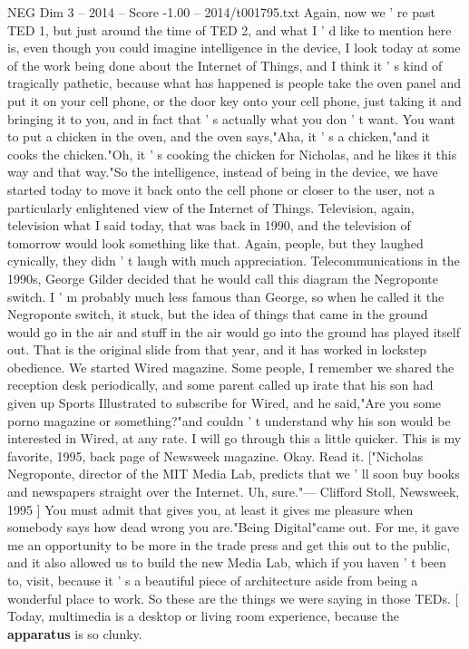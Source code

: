 \begin{textsample}{NEG Dim 3 – 2014 – Score -1.00 – 2014/t001795.txt}
Again, now we ' re past TED 1, but just around the time of TED 2, and what I ' d like to mention here is, even though you could imagine intelligence in the device, I look today at some of the work being done about the Internet of Things, and I think it ' s kind of tragically pathetic, because what has happened is people take the oven panel and put it on your cell phone, or the door key onto your cell phone, just taking it and bringing it to you, and in fact that ' s actually what you don ' t want.
You want to put a chicken in the oven, and the oven says,"Aha, it ' s a chicken,"and it cooks the chicken."Oh, it ' s cooking the chicken for Nicholas, and he likes it this way and that way."So the intelligence, instead of being in the device, we have started today to move it back onto the cell phone or closer to the user, not a particularly enlightened view of the Internet of Things.
Television, again, television what I said today, that was back in 1990, and the television of tomorrow would look something like that.
Again, people, but they laughed cynically, they didn ' t laugh with much appreciation.
Telecommunications in the 1990s, George Gilder decided that he would call this diagram the Negroponte switch.
I ' m probably much less famous than George, so when he called it the Negroponte switch, it stuck, but the idea of things that came in the ground would go in the air and stuff in the air would go into the ground has played itself out.
That is the original slide from that year, and it has worked in lockstep obedience.
We started Wired magazine.
Some people, I remember we shared the reception desk periodically, and some parent called up irate that his son had given up Sports Illustrated to subscribe for Wired, and he said,"Are you some porno magazine or something?"and couldn ' t understand why his son would be interested in Wired, at any rate.
I will go through this a little quicker.
This is my favorite, 1995, back page of Newsweek magazine.
Okay.
Read it. ["Nicholas Negroponte, director of the MIT Media Lab, predicts that we ' ll soon buy books and newspapers straight over the Internet.
Uh, sure."— Clifford Stoll, Newsweek, 1995 ] You must admit that gives you, at least it gives me pleasure when somebody says how dead wrong you are."Being Digital"came out.
For me, it gave me an opportunity to be more in the trade press and get this out to the public, and it also allowed us to build the new Media Lab, which if you haven ' t been to, visit, because it ' s a beautiful piece of architecture aside from being a wonderful place to work.
So these are the things we were saying in those TEDs. [ Today, multimedia is a desktop or living room experience, because the \textbf{apparatus} is so clunky.

\end{textsample}

